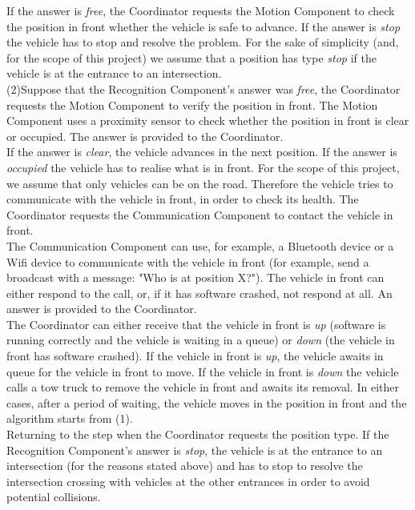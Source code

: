 \documentclass{memoir}
\begin{document}
If the answer is \textit{free}, the Coordinator requests the Motion Component to check the position in front whether the vehicle is safe to advance.
If the answer is \textit{stop} the vehicle has to stop and resolve the problem. For the sake of simplicity (and, for the scope of this project) we assume that a position has type \textit{stop} if the vehicle is at the entrance to an intersection.
\\

 (2)Suppose that the Recognition Component's answer was \textit{free}, the Coordinator requests the Motion Component to verify the position in front. The Motion Component uses a proximity sensor to check whether the position in front is clear or occupied. The answer is provided to the Coordinator.
\\

If the answer is \textit{clear}, the vehicle advances in the next position. If the answer is \textit{occupied} the vehicle has to realise what is in front. For the scope of this project, we assume that only vehicles can be on the road. Therefore the vehicle tries to communicate with the vehicle in front, in order to check its health. The Coordinator requests the Communication Component to contact the vehicle in front.
\\

The Communication Component can use, for example, a Bluetooth device or a Wifi device to communicate with the vehicle in front (for example, send a broadcast with a message: "Who is at position X?"). The vehicle in front can either respond to the call, or, if it has software crashed, not respond at all. An answer is provided to the Coordinator.
\\

The Coordinator can either receive that the vehicle in front is \textit{up} (software is running correctly and the vehicle is waiting in a queue) or  \textit{down} (the vehicle in front has software crashed). If the vehicle in front is \textit{up}, the vehicle awaits in queue for the vehicle in front to move. If the vehicle in front is \textit{down} the vehicle calls a tow truck to remove the vehicle in front and awaits its removal.
In either cases, after a period of waiting, the vehicle moves in the position in front and the algorithm starts from (1).
\\

Returning to the step when the Coordinator requests the position type. If the Recognition Component’s answer is \textit{stop}, the vehicle is at the entrance to an intersection (for the reasons stated above) and has to stop to resolve the intersection crossing with vehicles at the other entrances in order to avoid potential collisions.
\\
\end{document}
